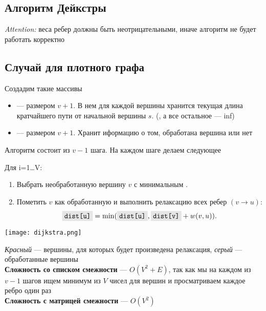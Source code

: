 \documentclass[a4paper]{article}
\begin{document}
\subsection{Алгоритм Дейкстры}
\textit{Attention:} веса ребер должны быть неотрицательными, иначе алгоритм не будет работать корректно
\subsection*{Случай для плотного графа}
Создадим такие массивы
\begin{itemize}
    \item {} — размером $v+1$. В нем для каждой вершины хранится текущая длина кратчайшего пути от начальной вершины $s$. (, а все остальное — inf)
    \item {} — размером $v+1$. Хранит иформацию о том, обработана вершина или нет
\end{itemize}
Алгоритм состоит из $v-1$ шага. На каждом шаге делаем следующее

Для i=1\ldots V:
  \begin{enumerate}
    \item Выбрать необработанную вершину $v$ с минимальным .
    \item Пометить $v$ как обработанную и выполнить релаксацию всех ребер $(v \to u)$:
      \[
        \code{dist[u]} = \min(\code{dist[u]}, \code{dist[v]} + w(v,u)).
      \]
  \end{enumerate}

\begin{center}
    \texttt{[image: dijkstra.png]}
    \label{dijkstra}
\end{center}
\textit{Красный} — вершины, для которых будет произведена релаксация, \textit{серый} — обработанные вершины\\[2mm]
\textbf{Сложность со списком смежности} — $O(V^2+E)$, так как мы на каждом из $v-1$ шагов ищем минимум из $V$ чисел для вершин и просматриваем каждое ребро один раз\\[2mm]
\textbf{Сложность с матрицей смежности} — $O(V^2)$
\end{document}
